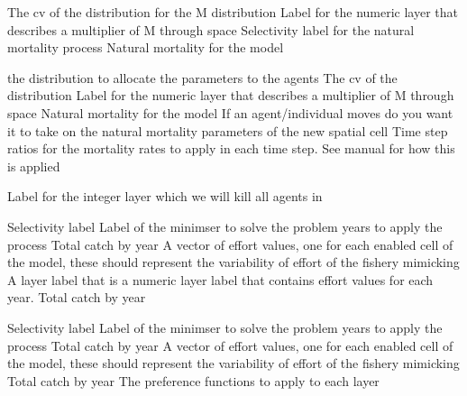  {The cv of the distribution for the M distribution}
 {Label for the numeric layer that describes a multiplier of M through space}
 {Selectivity label for the natural mortality process}
 {Natural mortality for the model}
\par\textbf{}\par
{} {the distribution to allocate the parameters to the agents}
 {The cv of the distribution}
 {Label for the numeric layer that describes a multiplier of M through space}
 {Natural mortality for the model}
 {If an agent/individual moves do you want it to take on the natural mortality parameters of the new spatial cell}
 {Time step ratios for the mortality rates to apply in each time step. See manual for how this is applied}
 {}
\par\textbf{}\par
{} {Label for the integer layer which we will kill all agents in}
\par\textbf{}\par
{} {Selectivity label}
 {Label of the minimser to solve the problem}
 {years to apply the process}
 {Total catch by year}
 {A vector of effort values, one for each enabled cell of the model, these should represent the variability of effort of the fishery mimicking}
 {A layer label that is a numeric layer label that contains effort values for each year.}
 {Total catch by year}
\par\textbf{}\par
{} {Selectivity label}
 {Label of the minimser to solve the problem}
 {years to apply the process}
 {Total catch by year}
 {A vector of effort values, one for each enabled cell of the model, these should represent the variability of effort of the fishery mimicking}
 {Total catch by year}
 {The preference functions to apply to each layer}
